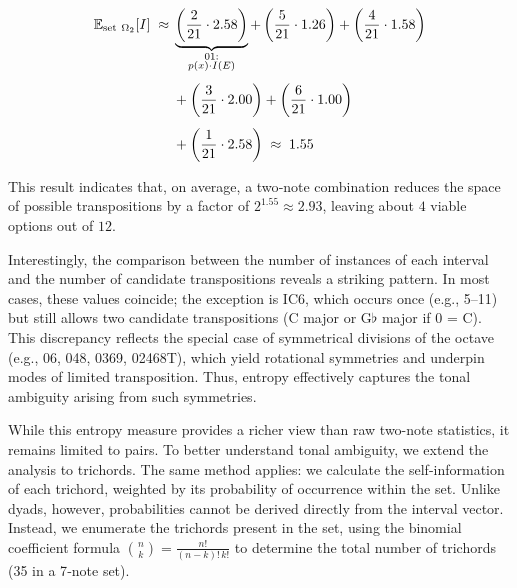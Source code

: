 \documentclass[10pt,twocolumn]{article}
\numberwithin{equation}{section} %
\begin{document}
    \begin{align}
        \mathbb{E}_{\text{set}~\Omega_{2}}[I] \;\approx\; &
        \underbrace{\left( \frac{2}{21} \cdot 2.58 \right)}_{\substack{\text{01:}\\ p(x)\cdot I(E)}} +
        \left( \frac{5}{21} \cdot 1.26 \right) +
        \left( \frac{4}{21} \cdot 1.58 \right)
        \notag \\[4pt]
        &+ \left( \frac{3}{21} \cdot 2.00 \right) +
        \left( \frac{6}{21} \cdot 1.00 \right)
        \notag \\[4pt]
        &+ \left( \frac{1}{21} \cdot 2.58 \right)
        \;\approx\; 1.55
        \label{eq:expectation-example}
    \end{align}

    This result indicates that, on average, a two‑note combination reduces the space of possible transpositions by a factor of $2^{1.55} \approx 2.93$, leaving about $4$ viable options out of $12$.

    Interestingly, the comparison between the number of instances of each interval and the number of candidate transpositions reveals a striking pattern.
    In most cases, these values coincide; the exception is IC6, which occurs once (e.g., 5–11) but still allows two candidate transpositions (C major or G$\flat$ major if 0 = C).
    This discrepancy reflects the special case of symmetrical divisions of the octave (e.g., 06, 048, 0369, 02468T), which yield rotational symmetries and underpin modes of limited transposition.
    Thus, entropy effectively captures the tonal ambiguity arising from such symmetries.

    While this entropy measure provides a richer view than raw two-note statistics, it remains limited to pairs.
    To better understand tonal ambiguity, we extend the analysis to trichords.
    The same method applies: we calculate the self-information of each trichord, weighted by its probability of occurrence within the set.
    Unlike dyads, however, probabilities cannot be derived directly from the interval vector.
    Instead, we enumerate the trichords present in the set, using the binomial coefficient formula $\binom{n}{k} = \frac{n!}{(n-k)! \, k!}$ to determine the total number of trichords (35 in a 7‑note set).

    
\end{document}
